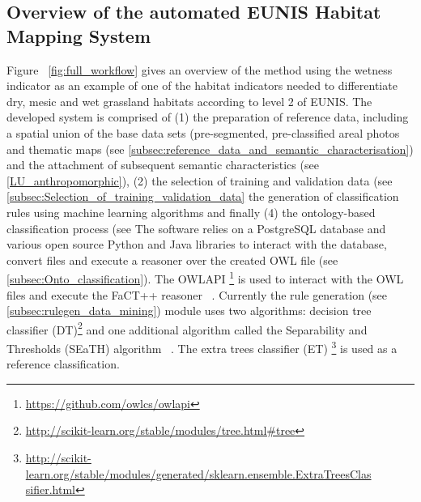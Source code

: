 \documentclass[authoryear,preprint,12pt,number]{elsarticle}
\begin{document}
\subsection{Overview of the automated EUNIS Habitat Mapping System}
Figure ~\ref{fig:full_workflow} gives an overview of the method using the
wetness indicator as an example of one of the habitat indicators needed to
differentiate dry, mesic and wet grassland habitats according to level 2 of
EUNIS. The developed system is comprised of (1) the preparation of reference
data, including a spatial union of the base data sets (pre-segmented,
pre-classified areal photos and thematic maps (see
\ref{subsec:reference_data_and_semantic_characterisation}) and the attachment of
subsequent semantic characteristics (see \ref{LU_anthropomorphic}), (2)
the selection of training and validation data (see
\ref{subsec:Selection_of_training_validation_data} the generation of
classification rules using machine learning algorithms and finally (4) the
ontology-based classification process (see The software relies on a PostgreSQL
database and various open source Python and Java libraries to interact with the
database, convert files and execute a reasoner over the created OWL file (see
\ref{subsec:Onto_classification}). The OWLAPI
\footnote{\url{https://github.com/owlcs/owlapi}} is used to interact with the
OWL files and execute the FaCT++ reasoner ~\citep{Tsarkov2006}. Currently the
rule generation (see \ref{subsec:rulegen_data_mining}) module uses two
algorithms: decision tree classifier
(DT)\footnote{\url{http://scikit-learn.org/stable/modules/tree.html\#tree}} and
one additional algorithm called the Separability and Thresholds (SEaTH)
algorithm ~\citep{Nussbaum2006}. The extra trees classifier (ET)
\footnote{\url{
http://scikit-learn.org/stable/modules/generated/sklearn.ensemble.ExtraTreesClas
sifier.html}}
is used as a reference classification.
\end{document}

